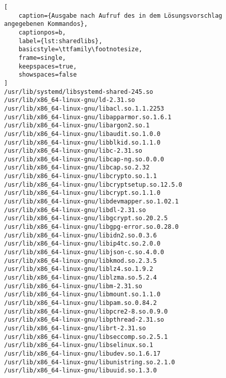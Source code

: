 \newpage
\begin{lstlisting}[
    caption={Ausgabe nach Aufruf des in dem Lösungsvorschlag angegebenen Kommandos},
    captionpos=b,
    label={lst:sharedlibs},
    basicstyle=\ttfamily\footnotesize,
    frame=single,
    keepspaces=true,
    showspaces=false
]
/usr/lib/systemd/libsystemd-shared-245.so
/usr/lib/x86_64-linux-gnu/ld-2.31.so
/usr/lib/x86_64-linux-gnu/libacl.so.1.1.2253
/usr/lib/x86_64-linux-gnu/libapparmor.so.1.6.1
/usr/lib/x86_64-linux-gnu/libargon2.so.1
/usr/lib/x86_64-linux-gnu/libaudit.so.1.0.0
/usr/lib/x86_64-linux-gnu/libblkid.so.1.1.0
/usr/lib/x86_64-linux-gnu/libc-2.31.so
/usr/lib/x86_64-linux-gnu/libcap-ng.so.0.0.0
/usr/lib/x86_64-linux-gnu/libcap.so.2.32
/usr/lib/x86_64-linux-gnu/libcrypto.so.1.1
/usr/lib/x86_64-linux-gnu/libcryptsetup.so.12.5.0
/usr/lib/x86_64-linux-gnu/libcrypt.so.1.1.0
/usr/lib/x86_64-linux-gnu/libdevmapper.so.1.02.1
/usr/lib/x86_64-linux-gnu/libdl-2.31.so
/usr/lib/x86_64-linux-gnu/libgcrypt.so.20.2.5
/usr/lib/x86_64-linux-gnu/libgpg-error.so.0.28.0
/usr/lib/x86_64-linux-gnu/libidn2.so.0.3.6
/usr/lib/x86_64-linux-gnu/libip4tc.so.2.0.0
/usr/lib/x86_64-linux-gnu/libjson-c.so.4.0.0
/usr/lib/x86_64-linux-gnu/libkmod.so.2.3.5
/usr/lib/x86_64-linux-gnu/liblz4.so.1.9.2
/usr/lib/x86_64-linux-gnu/liblzma.so.5.2.4
/usr/lib/x86_64-linux-gnu/libm-2.31.so
/usr/lib/x86_64-linux-gnu/libmount.so.1.1.0
/usr/lib/x86_64-linux-gnu/libpam.so.0.84.2
/usr/lib/x86_64-linux-gnu/libpcre2-8.so.0.9.0
/usr/lib/x86_64-linux-gnu/libpthread-2.31.so
/usr/lib/x86_64-linux-gnu/librt-2.31.so
/usr/lib/x86_64-linux-gnu/libseccomp.so.2.5.1
/usr/lib/x86_64-linux-gnu/libselinux.so.1
/usr/lib/x86_64-linux-gnu/libudev.so.1.6.17
/usr/lib/x86_64-linux-gnu/libunistring.so.2.1.0
/usr/lib/x86_64-linux-gnu/libuuid.so.1.3.0
\end{lstlisting}
